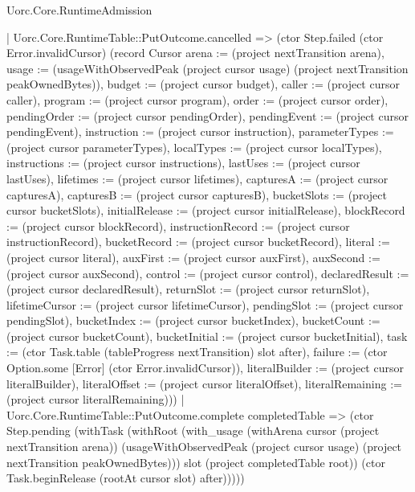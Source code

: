 \begin{lexlean}{Uorc.Core.RuntimeAdmission}
\begin{semanticmodule}
{        | Uorc.Core.RuntimeTable::PutOutcome.cancelled => (ctor Step.failed (ctor Error.invalidCursor) (record Cursor {arena := (project nextTransition arena), usage := (usageWithObservedPeak (project cursor usage) (project nextTransition peakOwnedBytes)), budget := (project cursor budget), caller := (project cursor caller), program := (project cursor program), order := (project cursor order), pendingOrder := (project cursor pendingOrder), pendingEvent := (project cursor pendingEvent), instruction := (project cursor instruction), parameterTypes := (project cursor parameterTypes), localTypes := (project cursor localTypes), instructions := (project cursor instructions), lastUses := (project cursor lastUses), lifetimes := (project cursor lifetimes), capturesA := (project cursor capturesA), capturesB := (project cursor capturesB), bucketSlots := (project cursor bucketSlots), initialRelease := (project cursor initialRelease), blockRecord := (project cursor blockRecord), instructionRecord := (project cursor instructionRecord), bucketRecord := (project cursor bucketRecord), literal := (project cursor literal), auxFirst := (project cursor auxFirst), auxSecond := (project cursor auxSecond), control := (project cursor control), declaredResult := (project cursor declaredResult), returnSlot := (project cursor returnSlot), lifetimeCursor := (project cursor lifetimeCursor), pendingSlot := (project cursor pendingSlot), bucketIndex := (project cursor bucketIndex), bucketCount := (project cursor bucketCount), bucketInitial := (project cursor bucketInitial), task := (ctor Task.table (tableProgress nextTransition) slot after), failure := (ctor Option.some [Error] (ctor Error.invalidCursor)), literalBuilder := (project cursor literalBuilder), literalOffset := (project cursor literalOffset), literalRemaining := (project cursor literalRemaining)}))
        | Uorc.Core.RuntimeTable::PutOutcome.complete completedTable => (ctor Step.pending (withTask (withRoot (with_usage (withArena cursor (project nextTransition arena)) (usageWithObservedPeak (project cursor usage) (project nextTransition peakOwnedBytes))) slot (project completedTable root)) (ctor Task.beginRelease (rootAt cursor slot) after)))))
}
\end{semanticmodule}
\end{lexlean}
